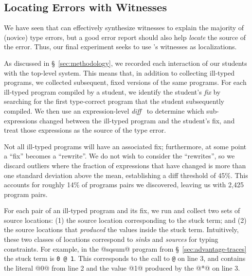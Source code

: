 
\subsection{Locating Errors with Witnesses}
\label{sec:locating}

We have seen that \toolname can effectively synthesize witnesses to
explain the majority of (novice) type errors, but a good error report
should also help \emph{locate} the source of the error.
%
Thus, our final experiment seeks to use \toolname's witnesses as
localizations.


As discussed in \S~\ref{sec:methodology}, we recorded
each interaction of our students with the \ocaml top-level system.
%
This means that, in addition to collecting ill-typed programs, we
collected subsequent, fixed versions of the same programs.
%
For each ill-typed program compiled by a student, we identify the student's
\emph{fix} by searching for the first type-correct program that the student
subsequently compiled.
%
We then use an expression-level \emph{diff}~\cite{Lempsink2009-xf} to
determine which sub-expressions changed between the ill-typed program
and the student's fix, and treat those expressions as the source of the
type error.

Not all ill-typed programs will have an associated fix; furthermore,
at some point a ``fix'' becomes a ``rewrite''.
%
We do not wish to consider the ``rewrites'', so we discard outliers
where the fraction of expressions that have changed is more than one
standard deviation above the mean, establishing a diff threshold of
45\%.
%
This accounts for roughly 14\% of programs pairs we discovered, leaving
us with 2,425 program pairs.

For each pair of an ill-typed program and its fix, we run \toolname and
collect two sets of source locations:
%
(1) the source location corresponding to the stuck term; and
%
(2) the source locations that \emph{produced} the values inside the
stuck term.
%
Intuitively, these two classes of locations correspond to \emph{sinks}
and \emph{sources} for typing constraints.
%
For example, in the @sqsum@ program from \S~\ref{sec:advantage-traces}
the stuck term is \verb!0 @ 1!.
%
This corresponds to the call to \verb!@! on line 3, and contains
the literal @0@ from line 2 and the value @1@ produced by the
@*@ on line 3.

